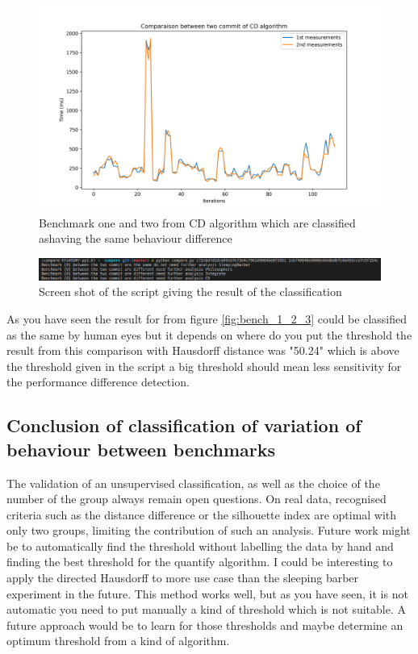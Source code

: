 \documentclass{article}
\begin{document}
\begin{figure}[]
    \centering
    \includegraphics[width=1\textwidth]{images/plot_CD_100.56999999999994.png}
    \caption{Benchmark one and two from CD algorithm which are classified ashaving the same behaviour difference}
    \label{fig:bench_1_2_4}
\end{figure}


\begin{figure}[]
    \centering
    \includegraphics[width=1\textwidth]{images/Screenshot_20200829_135418.png}
    \caption{Screen shot of the script giving the result of the classification}
    \label{fig:bench_1_2_5}
\end{figure}

As you have seen the result for from figure \ref{fig:bench_1_2_3} could be classified as the same by human eyes but it depends on where do you put the threshold the result from this comparison with Hausdorff distance was "50.24" which is above the threshold given in the script a big threshold should mean less sensitivity for the performance difference detection.\\

\pagebreak
\newpage


\subsection{Conclusion of classification of variation of behaviour between benchmarks}

The validation of an unsupervised classification, as well as the choice of the number of the group always remain open questions. On real data, recognised criteria such as the distance difference or the silhouette index are optimal with only two groups, limiting the contribution of such an analysis.
Future work might be to automatically find the threshold without labelling the data by hand and finding the best threshold for the quantify algorithm.
I could be interesting to apply the directed Hausdorff to more use case than the sleeping barber experiment in the future.
This method works well, but as you have seen, it is not automatic you need to put manually a kind of threshold which is not suitable.
A future approach would be to learn for those thresholds and maybe determine an optimum threshold from a kind of algorithm.
\end{document}
